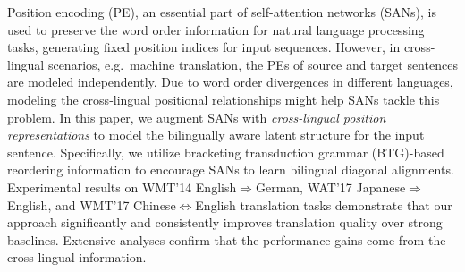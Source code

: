 Position encoding (PE), an essential part of self-attention networks (SANs), is used to preserve the word order information for natural language processing tasks, generating fixed position indices for input sequences. However, in cross-lingual scenarios, e.g.\ machine translation, the PEs of source and target sentences are modeled independently. Due to word order divergences in different languages, modeling the cross-lingual positional relationships might help SANs tackle this problem. In this paper, we augment SANs with \emph{cross-lingual position representations} to model the bilingually aware latent structure for the input sentence. Specifically, we utilize bracketing transduction grammar (BTG)-based reordering information to encourage SANs to learn bilingual diagonal alignments. Experimental results on WMT'14 English$\Rightarrow$German, WAT'17 Japanese$\Rightarrow$English, and WMT'17 Chinese$\Leftrightarrow$English translation tasks demonstrate that our approach significantly and consistently improves translation quality over strong baselines. Extensive analyses confirm that the performance gains come from the cross-lingual information.
